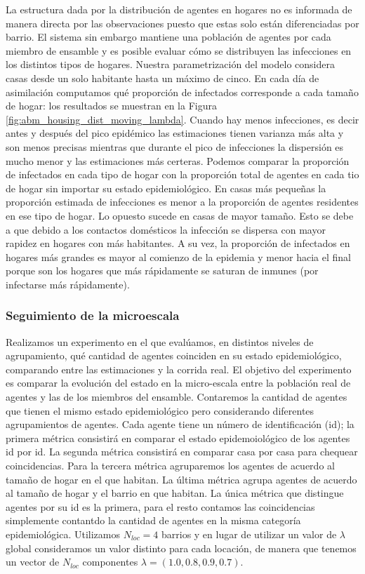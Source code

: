 La estructura dada por la distribución de agentes en hogares no es informada de manera directa por las observaciones puesto que estas solo están diferenciadas por barrio. El sistema sin embargo mantiene una población de agentes por cada miembro de ensamble y es posible evaluar cómo se distribuyen las infecciones en los distintos tipos de hogares. Nuestra parametrización del modelo considera casas desde un solo habitante hasta un máximo de cinco. En cada día de asimilación computamos qué proporción de infectados corresponde a cada tamaño de hogar: los resultados se muestran en la Figura \ref{fig:abm_housing_dist_moving_lambda}. Cuando hay menos infecciones, es decir antes y después del pico epidémico las estimaciones tienen varianza más alta y son menos precisas mientras que durante el pico de infecciones la dispersión es mucho menor y las estimaciones más certeras. Podemos comparar la proporción de infectados en cada tipo de hogar con la proporción total de agentes en cada tio de hogar sin importar su estado epidemiológico. En casas más pequeñas la proporción estimada de infecciones es menor a la proporción de agentes residentes en ese tipo de hogar. Lo opuesto sucede en casas de mayor tamaño. Esto se debe a que debido a los contactos domésticos la infección se dispersa con mayor rapidez en hogares con más habitantes. A su vez, la proporción de infectados en hogares más grandes es mayor al comienzo de la epidemia y menor hacia el final porque son los hogares que más rápidamente se saturan de inmunes (por infectarse más rápidamente).

\subsubsection{Seguimiento de la microescala}

Realizamos un experimento en el que evalúamos, en distintos niveles de agrupamiento, qué cantidad de agentes coinciden en su estado epidemiológico,  comparando entre las estimaciones y la corrida real. El objetivo del experimento es comparar la evolución del estado en la micro-escala entre la población real de agentes y las de los miembros del ensamble. Contaremos la cantidad de agentes que tienen el mismo estado epidemiológico pero considerando diferentes agrupamientos de agentes. Cada agente tiene un número de identificación (id); la primera métrica consistirá en comparar el estado epidemoiológico de los agentes id por id. La segunda métrica consistirá en comparar casa por casa para chequear coincidencias. Para la tercera métrica agruparemos los agentes de acuerdo al tamaño de hogar en el que habitan. La última métrica agrupa agentes de acuerdo al tamaño de hogar y el barrio en que habitan. La única métrica que distingue agentes por su id es la primera, para el resto contamos las coincidencias simplemente contantdo la cantidad de agentes en la misma categoría epidemiológica. Utilizamos $N_{loc} = 4$ barrios y en lugar de utilizar un valor de $\lambda$ global consideramos un valor distinto para cada locación, de manera que tenemos un vector de $N_{loc}$ componentes $\lambda = (1.0, 0.8, 0.9, 0.7)$. 

